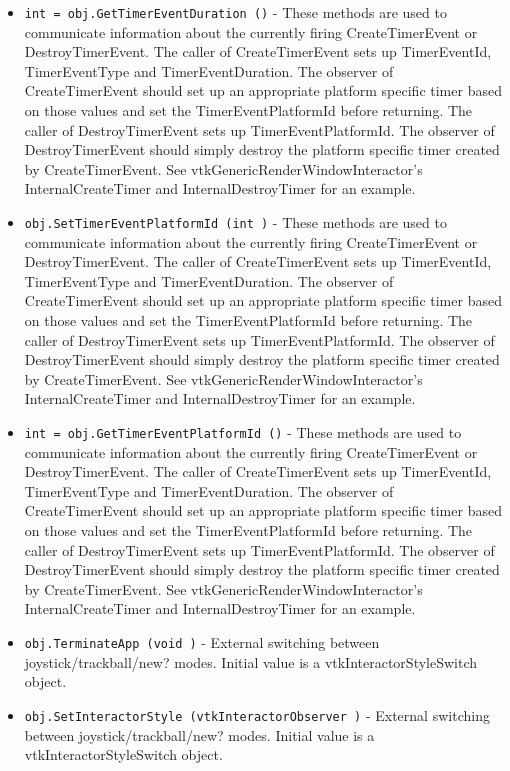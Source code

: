 \begin{itemize}
\item  \verb|int = obj.GetTimerEventDuration ()| -  These methods are used to communicate information about the currently
 firing CreateTimerEvent or DestroyTimerEvent. The caller of
 CreateTimerEvent sets up TimerEventId, TimerEventType and
 TimerEventDuration. The observer of CreateTimerEvent should set up an
 appropriate platform specific timer based on those values and set the
 TimerEventPlatformId before returning. The caller of DestroyTimerEvent
 sets up TimerEventPlatformId. The observer of DestroyTimerEvent should
 simply destroy the platform specific timer created by CreateTimerEvent.
 See vtkGenericRenderWindowInteractor's InternalCreateTimer and
 InternalDestroyTimer for an example.

\item  \verb|obj.SetTimerEventPlatformId (int )| -  These methods are used to communicate information about the currently
 firing CreateTimerEvent or DestroyTimerEvent. The caller of
 CreateTimerEvent sets up TimerEventId, TimerEventType and
 TimerEventDuration. The observer of CreateTimerEvent should set up an
 appropriate platform specific timer based on those values and set the
 TimerEventPlatformId before returning. The caller of DestroyTimerEvent
 sets up TimerEventPlatformId. The observer of DestroyTimerEvent should
 simply destroy the platform specific timer created by CreateTimerEvent.
 See vtkGenericRenderWindowInteractor's InternalCreateTimer and
 InternalDestroyTimer for an example.

\item  \verb|int = obj.GetTimerEventPlatformId ()| -  These methods are used to communicate information about the currently
 firing CreateTimerEvent or DestroyTimerEvent. The caller of
 CreateTimerEvent sets up TimerEventId, TimerEventType and
 TimerEventDuration. The observer of CreateTimerEvent should set up an
 appropriate platform specific timer based on those values and set the
 TimerEventPlatformId before returning. The caller of DestroyTimerEvent
 sets up TimerEventPlatformId. The observer of DestroyTimerEvent should
 simply destroy the platform specific timer created by CreateTimerEvent.
 See vtkGenericRenderWindowInteractor's InternalCreateTimer and
 InternalDestroyTimer for an example.

\item  \verb|obj.TerminateApp (void )| -  External switching between joystick/trackball/new? modes. Initial value
 is a vtkInteractorStyleSwitch object.

\item  \verb|obj.SetInteractorStyle (vtkInteractorObserver )| -  External switching between joystick/trackball/new? modes. Initial value
 is a vtkInteractorStyleSwitch object.


\end{itemize}

